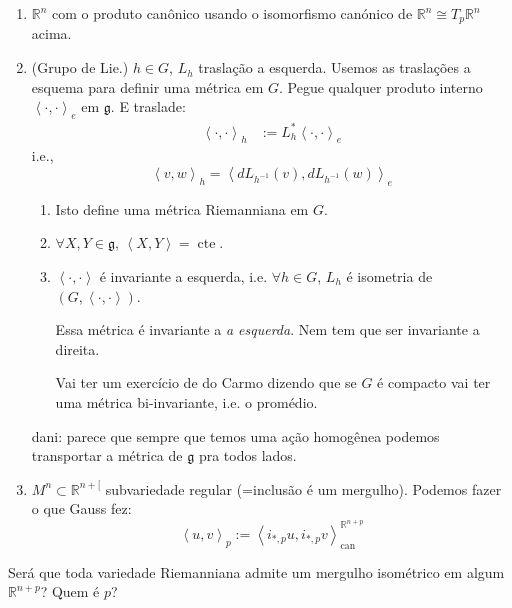 \begin{example}\leavevmode
\begin{enumerate}
\item \(\mathbb{R}^n\) com o produto canônico usando o isomorfismo canónico de \(\mathbb{R}^n \cong T_p \mathbb{R}^n\) acima.

\item (Grupo de Lie.) \(h \in G\), \(L_h\) traslação a esquerda. Usemos as traslações a esquema para definir uma métrica em \(G\). Pegue qualquer produto interno \(\left<\cdot,\cdot\right>_e\) em \(\mathfrak{g}\). E traslade:
	\begin{align*}
	\left<\cdot,\cdot\right>_h&:=L_h^*\left<\cdot,\cdot\right>_e
	\end{align*}
	i.e.,
	\[\left<v,w\right>_h=\left<dL_{h^{-1}}(v),dL_{h^{-1}}(w)\right>_e\]
\begin{exercise}\leavevmode
\begin{enumerate}
\item Isto define uma métrica Riemanniana em \(G\).
 \item \(\forall  X,Y \in \mathfrak{g}\), \(\left<X,Y\right>=\operatorname{cte}\).
\item \(\left<\cdot,\cdot\right>\) é invariante a esquerda, i.e. \(\forall  h \in G\), \(L_h\) é isometria de \((G,\left<\cdot,\cdot\right>)\).
\begin{remark}\leavevmode
Essa métrica é invariante a \textit{a esquerda}. Nem tem que ser invariante a direita.
\end{remark}
\begin{remark}\leavevmode
Vai ter um exercício de do Carmo dizendo que se \(G\) é compacto vai ter uma métrica bi-invariante, i.e. o promédio.
\end{remark}
\end{enumerate}
	{\color{7}dani:} parece que sempre que temos uma ação homogênea podemos transportar a métrica de \(\mathfrak{g}\) pra todos lados.
\end{exercise}	
\item \(M^n \subset \mathbb{R}^{n+[}\) subvariedade regular (=inclusão é um mergulho). Podemos fazer o que Gauss fez:
	\[\left<u,v\right>_p:=\left<i_{*,p}u,i_{*,p}v\right>^{\mathbb{R}^{n+p}}_{\operatorname{can}}\]
\end{enumerate}
\end{example}

\begin{question}\leavevmode
Será que toda variedade Riemanniana admite um mergulho isométrico em algum \(\mathbb{R}^{n+p}\)? Quem é \(p\)?
\end{question}

